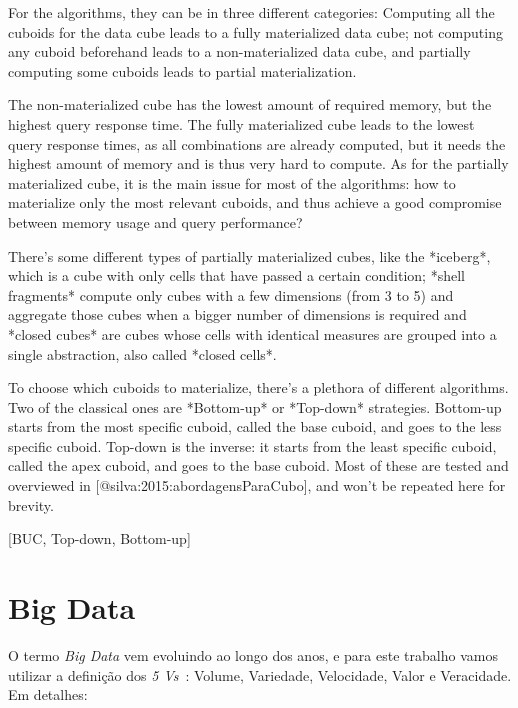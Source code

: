 For the algorithms, they can be in three different categories: Computing all the cuboids for the data cube leads to a fully materialized data cube; not computing any cuboid beforehand leads to a non-materialized data cube, and partially computing some cuboids leads to partial materialization.

The non-materialized cube has the lowest amount of required memory, but the highest query response time.
The fully materialized cube leads to the lowest query response times, as all combinations are already computed, but it needs the highest amount of memory and is thus very hard to compute.
As for the partially materialized cube, it is the main issue for most of the algorithms: how to materialize only the most relevant cuboids, and thus achieve a good compromise between memory usage and query performance?

There's some different types of partially materialized cubes, like the *iceberg*, which is a cube with only cells that have passed a certain condition; *shell fragments* compute only cubes with a few dimensions (from 3 to 5) and aggregate those cubes when a bigger number of dimensions is required and *closed cubes* are cubes whose cells with identical measures are grouped into a single abstraction, also called *closed cells*.

To choose which cuboids to materialize, there's a plethora of different algorithms.
Two of the classical ones are *Bottom-up* or *Top-down* strategies.
Bottom-up starts from the most specific cuboid, called the base cuboid, and goes to the less specific cuboid.
Top-down is the inverse: it starts from the least specific cuboid, called the apex cuboid, and goes to the base cuboid.
Most of these are tested and overviewed in [@silva:2015:abordagensParaCubo], and won't be repeated here for brevity.

[BUC, Top-down, Bottom-up]

\section{Big Data}
\label{ch:fun:bigdata}

O termo \textit{Big Data} vem evoluindo ao longo dos anos, e para este trabalho vamos utilizar a definição dos \textit{5 Vs}~\cite{bimonteOpenIssuesBig2016}: Volume, Variedade, Velocidade, Valor e Veracidade. Em detalhes:

